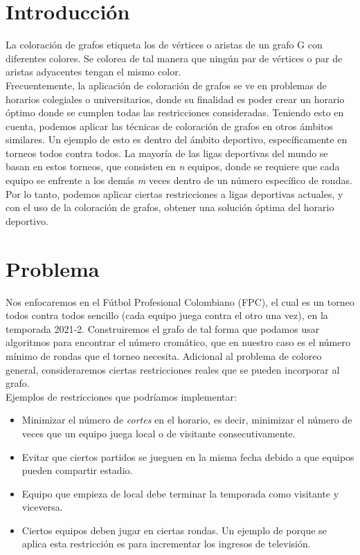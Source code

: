 \documentclass[11pt]{article}
\begin{document}
    \begin{multicols}{2}
    \setcounter{page}{1}

        \section{Introducción}
            La coloración de grafos etiqueta los de vértices o aristas de un grafo G con diferentes colores. 
            Se colorea de tal manera que ningún par de vértices o par de aristas adyacentes tengan el mismo color.\\
            Frecuentemente, la aplicación de coloración de grafos se ve en problemas de horarios colegiales o 
            universitarios, donde su finalidad es poder crear un horario óptimo donde se cumplen todas las restricciones consideradas. 
            Teniendo esto en cuenta, podemos aplicar las técnicas de coloración de grafos en otros ámbitos similares. 
            Un ejemplo de esto es dentro del ámbito deportivo, específicamente en torneos todos contra todos. La mayoría de las 
            ligas deportivas del mundo se basan en estos torneos, que consisten en \textit{n} equipos, donde se requiere que cada equipo se 
            enfrente a los demás \textit{m} veces dentro de un número específico de rondas. Por lo tanto, podemos aplicar ciertas 
            restricciones a ligas deportivas actuales, y con el uso de la coloración de grafos, obtener una solución óptima 
            del horario deportivo. 

        \section{Problema}
            Nos enfocaremos en el Fútbol Profesional Colombiano (FPC), el cual es un torneo todos contra todos sencillo 
            (cada equipo juega contra el otro una vez), en la temporada 2021-2. Construiremos el grafo de tal forma que podamos 
            usar algoritmos para encontrar el número cromático, que en nuestro caso es el número mínimo de rondas que el torneo necesita.
            Adicional al problema de coloreo general, consideraremos ciertas restricciones reales que se pueden incorporar al grafo.\\[10pt]
            Ejemplos de restricciones que podríamos implementar:

            \begin{itemize}
                \item Minimizar el número de \textit{cortes} en el horario, es decir, minimizar el número de veces que un equipo juega local o de visitante consecutivamente.
                \item Evitar que ciertos partidos se jueguen en la misma fecha debido a que equipos pueden compartir estadio.
                \item Equipo que empieza de local debe terminar la temporada como visitante y viceversa.
                \item Ciertos equipos deben jugar en ciertas rondas. Un ejemplo de porque se aplica esta restricción es para incrementar los ingresos de televisión.
            \end{itemize}
   

\end{multicols}
\end{document}

